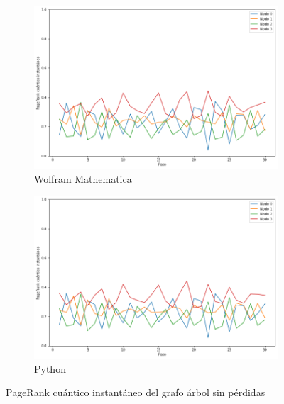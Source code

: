 \begin{figure}[H]
    \centering
    \begin{subfigure}[m]{0.45\textwidth}
        \centering
        \includegraphics[width=0.9\linewidth]{img/tree-inst-M.png}
        \caption{Wolfram Mathematica}
    \end{subfigure}
    \begin{subfigure}[m]{0.45\textwidth}
        \centering
        \includegraphics[width=0.9\linewidth]{img/tree-inst-lossless.png}
        \caption{Python}
    \end{subfigure}
    \caption[PageRank cuántico instantáneo del grafo árbol sin pérdidas]{PageRank cuántico instantáneo del grafo árbol sin pérdidas}
    \label{fig:insttreelossless}
\end{figure}

